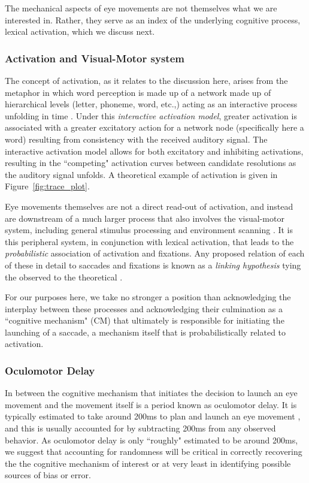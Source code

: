 The mechanical aspects of eye movements are not themselves what we are interested in. Rather, they serve as an index of the underlying cognitive process, lexical activation, which we discuss next.

\subsubsection{Activation and Visual-Motor system}

The concept of activation, as it relates to the discussion here, arises from the metaphor in which word perception is made up of a network made up of hierarchical levels (letter, phoneme, word, etc.,) acting as an interactive process unfolding in time \citep{McClelland1981}. Under this \textit{interactive activation model}, greater activation is associated with a greater excitatory action for a network node (specifically here a word) resulting from consistency with the received auditory signal. The interactive activation model allows for both excitatory and inhibiting activations, resulting in the ``competing" activation curves between candidate resolutions as the auditory signal unfolds. A theoretical example of activation is given in Figure~\ref{fig:trace_plot}.

Eye movements themselves are not a direct read-out of activation, and instead are downstream of a much larger process that also involves the visual-motor system, including general stimulus processing and environment scanning \citep{Salthouse1980}. It is this peripheral system, in conjunction with lexical activation, that leads to the \textit{probabilistic} association of activation and fixations. Any proposed relation of each of these in detail to saccades and fixations is known as a \textit{linking hypothesis} tying the observed to the theoretical \citep{Magnuson2019}. 

For our purposes here, we take no stronger a position than acknowledging the interplay between these processes and acknowledging their culmination as a ``cognitive mechanism" (CM) that ultimately is responsible for initiating the launching of a saccade, a mechanism itself that is probabilistically related to activation.



\subsubsection{Oculomotor Delay}

In between the cognitive mechanism that initiates the decision to launch an eye movement and the movement itself is a period known as oculomotor delay. It is typically estimated to take around 200ms to plan and launch an eye movement \cite{viviani1990time}, and this is usually accounted for by subtracting 200ms from any observed behavior. As oculomotor delay is only ``roughly" estimated to be around 200ms, we suggest that accounting for randomness will be critical in correctly recovering the the cognitive mechanism of interest or at very least in identifying possible sources of bias or error. 





